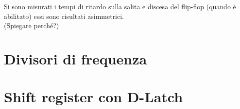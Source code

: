 \documentclass[10pt,a4paper]{article}
\begin{document}
Si sono misurati i tempi di ritardo sulla salita e discesa del flip-flop (quando è abilitato) essi sono risultati asimmetrici.\\

(Spiegare perché?)

\section{Divisori di frequenza}

\section{Shift register con D-Latch}
\end{document}
